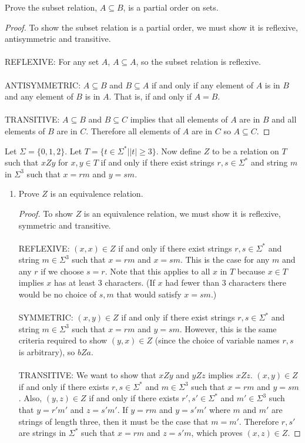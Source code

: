 \documentclass[]{exam}
\theoremstyle{definition}
\begin{document}
\begin{questions}
\question Prove the subset relation, $A \subseteq B$, is a partial order on
sets. 
\begin{proof}
To show the subset relation is a partial order, we must show it is reflexive, 
antisymmetric and transitive.
\\~\\
REFLEXIVE: For any set $A$, $A \subseteq A$, so the subset relation is
reflexive.
\\~\\
ANTISYMMETRIC: $A \subseteq B$ and $B \subseteq A$ if and only if any element
of $A$ is in $B$ and any element of $B$ is in $A$. That is, if and only if 
$A = B$. 
\\~\\
TRANSITIVE: $A \subseteq B$ and $B \subseteq C$ implies that all elements of $A$
are in $B$ and all elements of $B$ are in $C$. Therefore all elements of $A$ are
in $C$ so $A \subseteq C$.
\end{proof}

\question 
Let $\Sigma = \{0,1,2\}$.  Let $T = \{t \in \Sigma^* | |t| \geq 3\}$.
Now define $Z$ to be a relation on $T$ such that $xZy$ for $x,y \in
T$ if and only if there exist strings $r,s \in \Sigma^*$
and string $m$ in $\Sigma^3$ such that $x = rm$ and $y = sm$. 

\begin{enumerate}[label=\alph*)]
\item Prove $Z$ is an equivalence relation.

\begin{proof}
To show $Z$ is an equivalence relation, we must show it is reflexive, symmetric
and transitive.
\\~\\
REFLEXIVE: $(x,x) \in Z$ if and only if there exist strings $r,s \in \Sigma^*$ and
string $m \in \Sigma^3$ such that $x = rm$ and $x = sm$. This is the case
for any $m$ and any $r$ if we choose $s = r$. Note that this applies to
all $x$ in $T$ because $x \in T$ implies $x$ has at least $3$ characters. (If
$x$ had fewer than $3$ characters there would be no choice of $s,m$ that would
satisfy $x = sm$.)
\\~\\
SYMMETRIC: $(x,y) \in Z$ if and only if there exist strings $r,s \in \Sigma^*$ and
string $m \in \Sigma^3$ such that $x = rm$ and $y = sm$. However, this is
the same criteria required to show $(y,x) \in Z$ (since the choice of variable
names $r,s$ is arbitrary), so $bZa$.
\\~\\
TRANSITIVE: We want to show that $xZy$ and $yZz$ implies $xZz$. $(x,y) \in Z$
if and only if there exists $r,s \in \Sigma^*$ and $m \in \Sigma^3$ such 
that $x = rm$ and $y = sm$.  Also, $(y,z) \in Z$ if and only if there 
exists $r',s' \in \Sigma^*$ 
and $m' \in \Sigma^3$ such that $y = r'm'$ and $z = s'm'$. If $y = rm$
and $y = s'm'$ where $m$ and $m'$ are strings of length three, then
it must be the case that $m = m'$. Therefore $r, s'$ are strings in
$\Sigma^*$ such that $x = rm$ and $z = s'm$, which proves $(x,z) \in Z$.
\end{proof}



\end{enumerate}
\end{questions}
\end{document}
